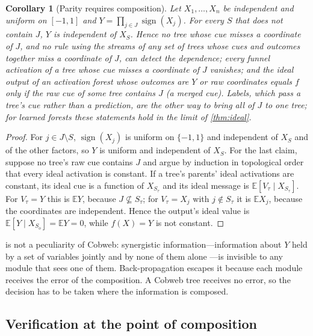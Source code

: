\documentclass[11pt]{article}
\newtheorem{corollary}[theorem]{Corollary}
\theoremstyle{definition}
\theoremstyle{remark}
\newcommand{\E}{\mathbb{E}}
\begin{document}
\begin{corollary}[Parity requires composition]\label{cor:parity}
Let $X_1,\dots,X_n$ be independent and uniform on $[-1,1]$ and
$Y=\prod_{j\in J}\operatorname{sign}(X_j)$.  For every $S$ that does not contain $J$,
$Y$ is independent of $X_S$.  Hence no tree whose cue misses a coordinate of $J$, and no rule using the streams of
any set of trees whose cues and outcomes together miss a coordinate of $J$, can detect the
dependence; every funnel activation of a tree whose cue misses a coordinate of $J$
vanishes; and the ideal output of an activation forest whose outcomes are $Y$ or raw
coordinates equals $f$ only if the raw cue of some tree contains $J$ (a merged cue).
Labels, which pass a tree's cue rather than a prediction, are the other way to bring all
of $J$ to one tree; for learned forests these statements hold in the limit of
\cref{thm:ideal}.
\end{corollary}
\begin{proof}
For $j\in J\setminus S$, $\operatorname{sign}(X_j)$ is uniform on $\{-1,1\}$ and
independent of $X_S$ and of the other factors, so $Y$ is uniform and independent of $X_S$.
For the last claim, suppose no tree's raw cue contains $J$ and argue by induction in
topological order that every ideal activation is constant.  If a tree's parents' ideal
activations are constant, its ideal cue is a function of $X_{S_\tau}$ and its ideal
message is $\E[V_\tau\mid X_{S_\tau}]$.  For $V_\tau=Y$ this is $\E Y$, because $J\not\subseteq
S_\tau$; for $V_\tau=X_j$ with $j\notin S_\tau$ it is $\E X_j$, because the coordinates are
independent.  Hence the output's ideal value is $\E[Y\mid X_{S_o}]=\E Y=0$, while
$f(X)=Y$ is not constant.
\end{proof}

 is not a peculiarity of Cobweb: synergistic information---information
about $Y$ held by a set of variables jointly and by none of them alone
\citep{williams2010}---is invisible to any module that sees one of them.  Back-propagation
escapes it because each module receives the error of the composition.  A Cobweb tree
receives no error, so the decision has to be taken where the information is composed.

\subsection{Verification at the point of composition}
\end{document}
